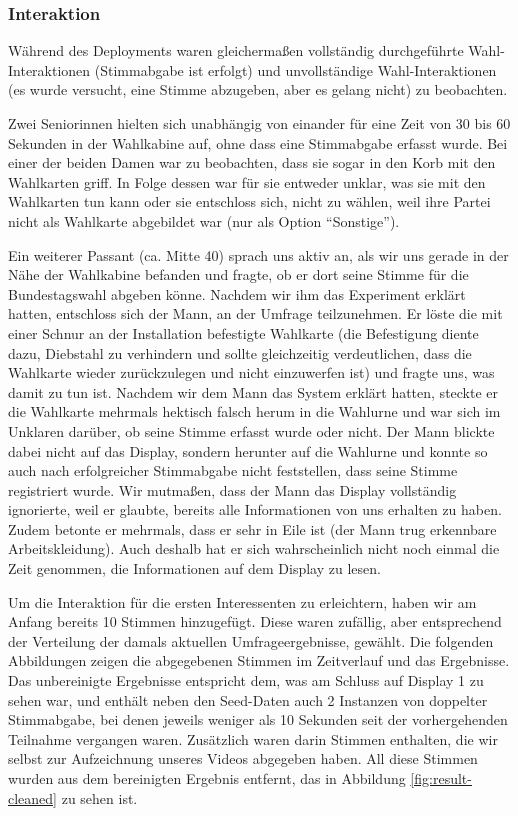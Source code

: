 \subsubsection{Interaktion}\label{interaktion}

Während des Deployments waren gleichermaßen vollständig durchgeführte Wahl-Interaktionen (Stimmabgabe ist erfolgt) und unvollständige Wahl-Interaktionen (es wurde versucht, eine Stimme abzugeben, aber es gelang nicht) zu beobachten.

Zwei Seniorinnen hielten sich unabhängig von einander für eine Zeit von 30 bis 60 Sekunden in der Wahlkabine auf, ohne dass eine Stimmabgabe erfasst wurde.
Bei einer der beiden Damen war zu beobachten, dass sie sogar in den Korb mit den Wahlkarten griff.
In Folge dessen war für sie entweder unklar, was sie mit den Wahlkarten tun kann oder sie entschloss sich, nicht zu wählen, weil ihre Partei nicht als Wahlkarte abgebildet war (nur als Option ``Sonstige'').

Ein weiterer Passant (ca. Mitte 40) sprach uns aktiv an, als wir uns gerade in der Nähe der Wahlkabine befanden und fragte, ob er dort seine Stimme für die Bundestagswahl abgeben könne.
Nachdem wir ihm das Experiment erklärt hatten, entschloss sich der Mann, an der Umfrage teilzunehmen.
Er löste die mit einer Schnur an der Installation befestigte Wahlkarte (die Befestigung diente dazu, Diebstahl zu verhindern und sollte gleichzeitig verdeutlichen, dass die Wahlkarte wieder zurückzulegen und nicht einzuwerfen ist) und fragte uns, was damit zu tun ist.
Nachdem wir dem Mann das System erklärt hatten, steckte er die Wahlkarte mehrmals hektisch falsch herum in die Wahlurne und war sich im Unklaren darüber, ob seine Stimme erfasst wurde oder nicht.
Der Mann blickte dabei nicht auf das Display, sondern herunter auf die Wahlurne und konnte so auch nach erfolgreicher Stimmabgabe nicht feststellen, dass seine Stimme registriert wurde.
Wir mutmaßen, dass der Mann das Display vollständig ignorierte, weil er glaubte, bereits alle Informationen von uns erhalten zu haben.
Zudem betonte er mehrmals, dass er sehr in Eile ist (der Mann trug erkennbare Arbeitskleidung).
Auch deshalb hat er sich wahrscheinlich nicht noch einmal die Zeit genommen, die Informationen auf dem Display zu lesen.

Um die Interaktion für die ersten Interessenten zu erleichtern, haben wir am Anfang bereits 10 Stimmen hinzugefügt.
Diese waren zufällig, aber entsprechend der Verteilung der damals aktuellen Umfrageergebnisse, gewählt.
Die folgenden Abbildungen zeigen die abgegebenen Stimmen im Zeitverlauf und das Ergebnisse.
Das unbereinigte Ergebnisse entspricht dem, was am Schluss auf Display 1 zu sehen war, und enthält neben den Seed-Daten auch 2 Instanzen von doppelter Stimmabgabe, bei denen jeweils weniger als 10 Sekunden seit der vorhergehenden Teilnahme vergangen waren.
Zusätzlich waren darin Stimmen enthalten, die wir selbst zur Aufzeichnung unseres Videos abgegeben haben.
All diese Stimmen wurden aus dem bereinigten Ergebnis entfernt, das in Abbildung \ref{fig:result-cleaned} zu sehen ist.

